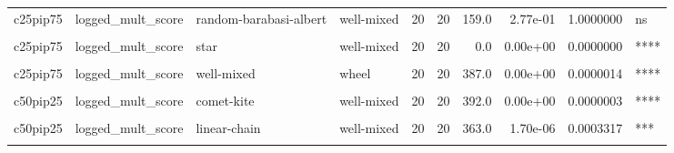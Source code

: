 \documentclass[
]{book}
\begin{document}
\begin{table}
\begin{tabular}{l|l|l|l|r|r|r|r|r|l}
\hline
\cellcolor{gray!6}{c25pip75} & \cellcolor{gray!6}{logged\_mult\_score} & \cellcolor{gray!6}{linear-chain} & \cellcolor{gray!6}{well-mixed} & \cellcolor{gray!6}{20} & \cellcolor{gray!6}{20} & \cellcolor{gray!6}{0.0} & \cellcolor{gray!6}{0.00e+00} & \cellcolor{gray!6}{0.0000000} & \cellcolor{gray!6}{****}\\
\hline
c25pip75 & logged\_mult\_score & random-barabasi-albert & well-mixed & 20 & 20 & 159.0 & 2.77e-01 & 1.0000000 & ns\\
\hline
\cellcolor{gray!6}{c25pip75} & \cellcolor{gray!6}{logged\_mult\_score} & \cellcolor{gray!6}{random-waxman} & \cellcolor{gray!6}{well-mixed} & \cellcolor{gray!6}{20} & \cellcolor{gray!6}{20} & \cellcolor{gray!6}{95.0} & \cellcolor{gray!6}{4.00e-03} & \cellcolor{gray!6}{0.5080000} & \cellcolor{gray!6}{ns}\\
\hline
c25pip75 & logged\_mult\_score & star & well-mixed & 20 & 20 & 0.0 & 0.00e+00 & 0.0000000 & ****\\
\hline
\cellcolor{gray!6}{c25pip75} & \cellcolor{gray!6}{logged\_mult\_score} & \cellcolor{gray!6}{toroidal-lattice} & \cellcolor{gray!6}{well-mixed} & \cellcolor{gray!6}{20} & \cellcolor{gray!6}{20} & \cellcolor{gray!6}{0.0} & \cellcolor{gray!6}{0.00e+00} & \cellcolor{gray!6}{0.0000000} & \cellcolor{gray!6}{****}\\
\hline
c25pip75 & logged\_mult\_score & well-mixed & wheel & 20 & 20 & 387.0 & 0.00e+00 & 0.0000014 & ****\\
\hline
\cellcolor{gray!6}{c25pip75} & \cellcolor{gray!6}{logged\_mult\_score} & \cellcolor{gray!6}{well-mixed} & \cellcolor{gray!6}{windmill} & \cellcolor{gray!6}{20} & \cellcolor{gray!6}{20} & \cellcolor{gray!6}{399.0} & \cellcolor{gray!6}{0.00e+00} & \cellcolor{gray!6}{0.0000000} & \cellcolor{gray!6}{****}\\
\hline
c50pip25 & logged\_mult\_score & comet-kite & well-mixed & 20 & 20 & 392.0 & 0.00e+00 & 0.0000003 & ****\\
\hline
\cellcolor{gray!6}{c50pip25} & \cellcolor{gray!6}{logged\_mult\_score} & \cellcolor{gray!6}{cycle} & \cellcolor{gray!6}{well-mixed} & \cellcolor{gray!6}{20} & \cellcolor{gray!6}{20} & \cellcolor{gray!6}{367.0} & \cellcolor{gray!6}{8.00e-07} & \cellcolor{gray!6}{0.0001597} & \cellcolor{gray!6}{***}\\
\hline
c50pip25 & logged\_mult\_score & linear-chain & well-mixed & 20 & 20 & 363.0 & 1.70e-06 & 0.0003317 & ***\\
\hline
\cellcolor{gray!6}{c50pip25} & \cellcolor{gray!6}{logged\_mult\_score} & \cellcolor{gray!6}{random-barabasi-albert} & \cellcolor{gray!6}{well-mixed} & \cellcolor{gray!6}{20} & \cellcolor{gray!6}{20} & \cellcolor{gray!6}{345.0} & \cellcolor{gray!6}{3.36e-05} & \cellcolor{gray!6}{0.0055104} & \cellcolor{gray!6}{**}\\

\end{tabular}
\end{table}
\end{document}
